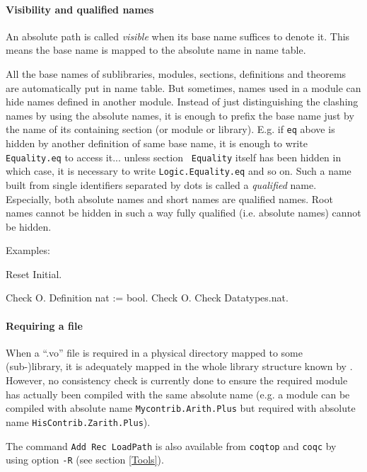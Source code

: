 \documentclass[11pt]{article}
\begin{document}
\paragraph{Visibility and qualified names}
An absolute path is called {\it visible} when its base name suffices
to denote it. This means the base name is mapped to the absolute name
in {\Coq} name table.

All the base names of sublibraries, modules, sections, definitions and
theorems are automatically put in {\Coq} name table. But sometimes,
names used in a module can hide names defined in another module.
Instead of just distinguishing the clashing names by using the
absolute names, it is enough to prefix the base name just by the name
of its containing section (or module or library). E.g. if {\tt eq}
above is hidden by another definition of same base name, it is enough
to write {\tt Equality.eq} to access it... unless section {\tt
Equality} itself has been hidden in which case, it is necessary to
write {\tt Logic.Equality.eq} and so on. Such a name built from
single identifiers separated by dots is called a {\it qualified}
name. Especially, both absolute names and short names are qualified
names. Root names cannot be hidden in such a way fully qualified
(i.e. absolute names) cannot be hidden.

Examples:

\begin{coq_eval}
Reset Initial.
\end{coq_eval}

\begin{coq_example}
Check O.
Definition nat := bool.
Check O.
Check Datatypes.nat.
\end{coq_example}

\paragraph{Requiring a file}

When a ``.vo'' file is required in a physical directory mapped to some
(sub-)library, it is adequately mapped in the whole library structure
known by \Coq. However, no consistency check is currently done to
ensure the required module has actually been compiled with the same
absolute name (e.g. a module can be compiled with absolute name
{\tt Mycontrib.Arith.Plus} but required with absolute name
{\tt HisContrib.Zarith.Plus}).

The command {\tt Add Rec LoadPath} is also available from {\tt coqtop}
and {\tt coqc} by using option \verb=-R= (see section \ref{Tools}).
\end{document}
